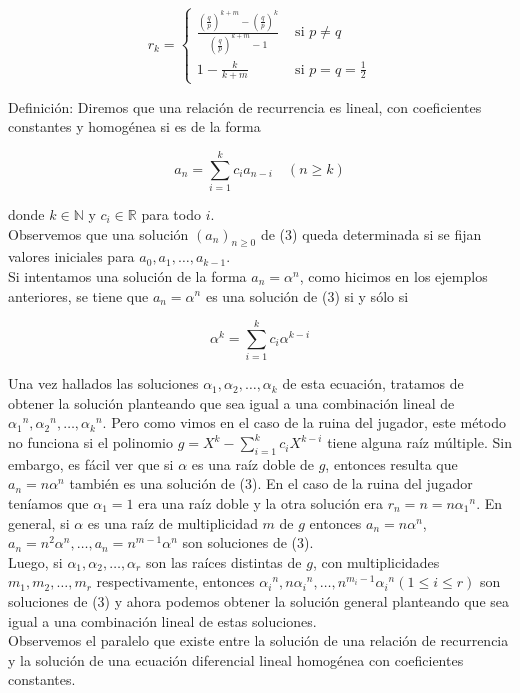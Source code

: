 \documentclass[10pt]{article}
\begin{document}
$$
r_{k}= \begin{cases}\frac{\left(\frac{q}{p}\right)^{k+m}-\left(\frac{q}{p}\right)^{k}}{\left(\frac{q}{p}\right)^{k+m}-1} & \text { si } p \neq q \\ 1-\frac{k}{k+m} & \text { si } p=q=\frac{1}{2}\end{cases}
$$

Definición: Diremos que una relación de recurrencia es lineal, con coeficientes constantes y homogénea si es de la forma


\begin{equation*}
a_{n}=\sum_{i=1}^{k} c_{i} a_{n-i} \quad(n \geq k) \tag{3}
\end{equation*}


donde $k \in \mathbb{N}$ y $c_{i} \in \mathbb{R}$ para todo $i$.\\
Observemos que una solución $\left(a_{n}\right)_{n \geq 0}$ de (3) queda determinada si se fijan valores iniciales para $a_{0}, a_{1}, \ldots, a_{k-1}$.\\
Si intentamos una solución de la forma $a_{n}=\alpha^{n}$, como hicimos en los ejemplos anteriores, se tiene que $a_{n}=\alpha^{n}$ es una solución de (3) si y sólo si

$$
\alpha^{k}=\sum_{i=1}^{k} c_{i} \alpha^{k-i}
$$

Una vez hallados las soluciones $\alpha_{1}, \alpha_{2}, \ldots, \alpha_{k}$ de esta ecuación, tratamos de obtener la solución planteando que sea igual a una combinación lineal de $\alpha_{1}{ }^{n}, \alpha_{2}{ }^{n}, \ldots, \alpha_{k}{ }^{n}$. Pero como vimos en el caso de la ruina del jugador, este método no funciona si el polinomio $g=X^{k}-\sum_{i=1}^{k} c_{i} X^{k-i}$ tiene alguna raíz múltiple. Sin embargo, es fácil ver que si $\alpha$ es una raíz doble de $g$, entonces resulta que $a_{n}=n \alpha^{n}$ también es una solución de (3). En el caso de la ruina del jugador teníamos que $\alpha_{1}=1$ era una raíz doble y la otra solución era $r_{n}=n=n \alpha_{1}{ }^{n}$. En general, si $\alpha$ es una raíz de multiplicidad $m$ de $g$ entonces $a_{n}=n \alpha^{n}$, $a_{n}=n^{2} \alpha^{n}, \ldots, a_{n}=n^{m-1} \alpha^{n}$ son soluciones de (3).\\
Luego, si $\alpha_{1}, \alpha_{2}, \ldots, \alpha_{r}$ son las raíces distintas de $g$, con multiplicidades $m_{1}, m_{2}, \ldots, m_{r}$ respectivamente, entonces $\alpha_{i}{ }^{n}, n \alpha_{i}{ }^{n}, \ldots, n^{m_{i}-1} \alpha_{i}{ }^{n}(1 \leq i \leq r)$ son soluciones de (3) y ahora podemos obtener la solución general planteando que sea igual a una combinación lineal de estas soluciones.\\
Observemos el paralelo que existe entre la solución de una relación de recurrencia y la solución de una ecuación diferencial lineal homogénea con coeficientes constantes.
\end{document}
